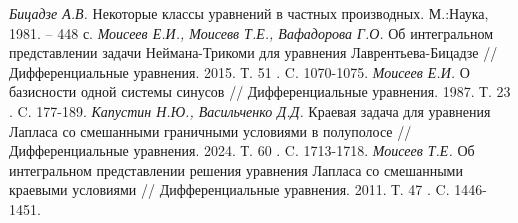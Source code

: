 \documentclass[12pt, a4paper]{article}
\begin{document}
\newpage
\begin{thebibliography}{30}
{\it Бицадзе А.В.} Некоторые классы уравнений в частных производных. М.:Наука, 1981. -- 448 с.
{\it Моисеев Е.И., Моисевв Т.Е., Вафадорова Г.О.} Об интегральном представлении задачи Неймана-Трикоми для уравнения Лаврентьева-Бицадзе // Дифференциальные уравнения. 2015. Т. 51 . C. 1070-1075.
{\it Моисеев Е.И.} О базисности одной системы синусов // Дифференциальные уравнения. 1987. Т. 23 . C. 177-189.
{\it Капустин Н.Ю., Васильченко Д.Д.} Краевая задача для уравнения Лапласа со смешанными граничными условиями в полуполосе // Дифференциальные уравнения. 2024. Т. 60 . C. 1713-1718.
{\it Моисеев Т.Е.} Об интегральном представлении решения уравнения Лапласа со смешанными краевыми условиями // Дифференциальные уравнения. 2011. Т. 47 . C. 1446-1451.


\end{thebibliography}
\end{document}
